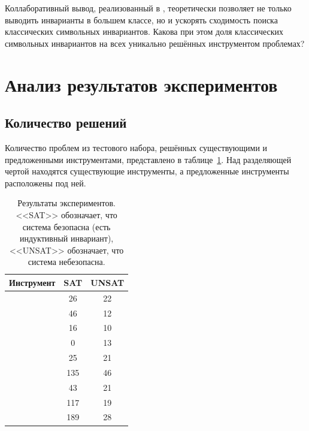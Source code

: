 \begin{resquest}\label{rq:char}
Коллаборативный вывод, реализованный в \theringenCICI{}, теоретически позволяет не только выводить инварианты в большем классе, но и ускорять сходимость поиска классических символьных инвариантов. Какова при этом доля классических символьных инвариантов на всех уникально решённых инструментом \theringenCICI{} проблемах?
\end{resquest}

\section{Анализ результатов экспериментов}

\subsection{Количество решений}

Количество проблем из тестового набора, решённых существующими и предложенными инструментами, представлено в таблице~\ref{table:eval-all}. Над разделяющей чертой находятся существующие инструменты, а предложенные инструменты расположены под ней.

\begin{table}[t]
    \caption{Результаты экспериментов. <<SAT>> обозначает, что система безопасна (есть индуктивный инвариант), <<UNSAT>> обозначает, что система небезопасна.}
    \label{table:eval-all}
    \small
    \centering
    \begin{tabular}{ |l||c|c| }
    \hline\hline
    Инструмент & SAT & UNSAT\\\hline\hline
    \racer{} & 26 & 22\\
    \eldarica{} & 46 & 12\\
    \vericat{} & 16 & 10\\
    \cvcind{} & 0 & 13\\
    \hline
    \ringen{\cvc{}} & 25 & 21\\
    \ringen{\vampire{}} & 135 & 46\\
    \ringenSync{} & 43 & 21\\
    \ringenCICI{\cvc{}} & 117 & 19\\
    \ringenCICI{\vampire{}} & 189 & 28\\
    \hline\hline
    \end{tabular}
\end{table}


